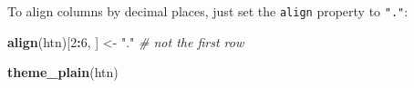 \documentclass[]{article}
\newenvironment{Shaded}{\begin{snugshade}}{\end{snugshade}}
\newcommand{\CommentTok}[1]{\textcolor[rgb]{0.56,0.35,0.01}{\textit{#1}}}
\newcommand{\DecValTok}[1]{\textcolor[rgb]{0.00,0.00,0.81}{#1}}
\newcommand{\KeywordTok}[1]{\textcolor[rgb]{0.13,0.29,0.53}{\textbf{#1}}}
\newcommand{\NormalTok}[1]{#1}
\newcommand{\OperatorTok}[1]{\textcolor[rgb]{0.81,0.36,0.00}{\textbf{#1}}}
\newcommand{\StringTok}[1]{\textcolor[rgb]{0.31,0.60,0.02}{#1}}
\begin{document}
\FloatBarrier

To align columns by decimal places, just set the \texttt{align} property
to \texttt{"."}:

\begin{Shaded}
\begin{Highlighting}[]
\KeywordTok{align}\NormalTok{(htn)[}\DecValTok{2}\OperatorTok{:}\DecValTok{6}\NormalTok{, ] <-}\StringTok{ "."} \CommentTok{# not the first row}

\KeywordTok{theme_plain}\NormalTok{(htn)}
\end{Highlighting}
\end{Shaded}

 
  \providecommand{\huxb}[2]{\arrayrulecolor[RGB]{#1}\global\arrayrulewidth=#2pt}
  \providecommand{\huxvb}[2]{\color[RGB]{#1}\vrule width #2pt}
  \providecommand{\huxtpad}[1]{\rule{0pt}{\baselineskip+#1}}
  \providecommand{\huxbpad}[1]{\rule[-#1]{0pt}{#1}}
\end{document}
